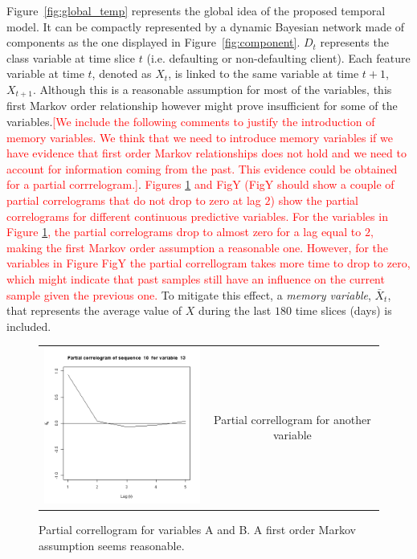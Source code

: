 Figure~\ref{fig:global_temp} represents the global idea of the proposed temporal model. It can be compactly represented by a dynamic Bayesian network made of components as the one displayed in 
Figure~\ref{fig:component}. $D_t$ represents the class variable at time slice $t$ (i.e. defaulting or non-defaulting client). Each feature variable at time $t$, denoted as $X_t$, is linked to the same variable at time $t+1$, $X_{t+1}$. Although this is a reasonable assumption for most of the variables, this first Markov order relationship however might prove insufficient for some of the variables.\textcolor{red}{[We include the following comments to justify the introduction of memory variables. We think that we need to introduce memory variables if we have evidence that first order Markov relationships does not hold and we need to account for information coming from the past. This evidence could be obtained for a partial corrrelogram.]}. \textcolor{red}{Figures \ref{fig:cajamarPC1order} and FigY (FigY should show a couple of partial correlograms that do not drop to zero at lag $2$)  show the partial correlograms for different continuous predictive variables. For the variables in Figure \ref{fig:cajamarPC1order}, the partial correlograms drop to almost zero for a lag equal to $2$, making the first Markov order assumption a reasonable one. However, for the variables in Figure FigY the partial correllogram takes more time to drop to zero, which might indicate that past samples still have an influence on the current sample given the previous one.} To mitigate this effect,  a \emph{memory variable}, $\bar{X}_t$, that represents the average value of $X$ during the last $180$ time slices (days) is included. 


\begin{figure}
  \centering
    \begin{tabular}{cc}
    \includegraphics[width=70mm]{figures/CajaMarpcrl13}&
    \begin{minipage}[b]{0.45\linewidth} Partial correllogram for another variable\end{minipage}\\
  \end{tabular}
    \caption{\label{fig:cajamarPC1order}Partial correllogram for variables A and B. A first order Markov assumption seems reasonable.}
\end{figure}


